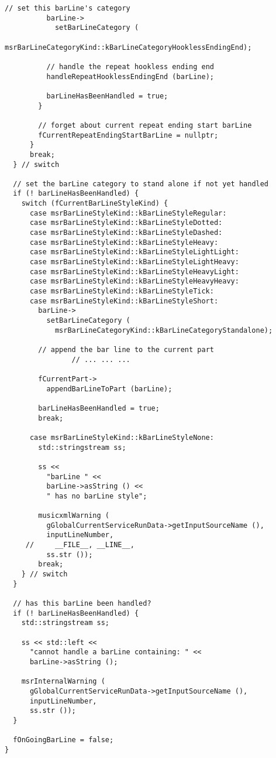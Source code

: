 \begin{lstlisting}[language=CPlusPlus]
          // set this barLine's category
          barLine->
            setBarLineCategory (
              msrBarLineCategoryKind::kBarLineCategoryHooklessEndingEnd);

          // handle the repeat hookless ending end
          handleRepeatHooklessEndingEnd (barLine);

          barLineHasBeenHandled = true;
        }

        // forget about current repeat ending start barLine
        fCurrentRepeatEndingStartBarLine = nullptr;
      }
      break;
  } // switch

  // set the barLine category to stand alone if not yet handled
  if (! barLineHasBeenHandled) {
    switch (fCurrentBarLineStyleKind) {
      case msrBarLineStyleKind::kBarLineStyleRegular:
      case msrBarLineStyleKind::kBarLineStyleDotted:
      case msrBarLineStyleKind::kBarLineStyleDashed:
      case msrBarLineStyleKind::kBarLineStyleHeavy:
      case msrBarLineStyleKind::kBarLineStyleLightLight:
      case msrBarLineStyleKind::kBarLineStyleLightHeavy:
      case msrBarLineStyleKind::kBarLineStyleHeavyLight:
      case msrBarLineStyleKind::kBarLineStyleHeavyHeavy:
      case msrBarLineStyleKind::kBarLineStyleTick:
      case msrBarLineStyleKind::kBarLineStyleShort:
        barLine->
          setBarLineCategory (
            msrBarLineCategoryKind::kBarLineCategoryStandalone);

        // append the bar line to the current part
				// ... ... ...

        fCurrentPart->
          appendBarLineToPart (barLine);

        barLineHasBeenHandled = true;
        break;

      case msrBarLineStyleKind::kBarLineStyleNone:
        std::stringstream ss;

        ss <<
          "barLine " <<
          barLine->asString () <<
          " has no barLine style";

        musicxmlWarning (
          gGlobalCurrentServiceRunData->getInputSourceName (),
          inputLineNumber,
     //     __FILE__, __LINE__,
          ss.str ());
        break;
    } // switch
  }

  // has this barLine been handled?
  if (! barLineHasBeenHandled) {
    std::stringstream ss;

    ss << std::left <<
      "cannot handle a barLine containing: " <<
      barLine->asString ();

    msrInternalWarning (
      gGlobalCurrentServiceRunData->getInputSourceName (),
      inputLineNumber,
      ss.str ());
  }

  fOnGoingBarLine = false;
}
\end{lstlisting}


